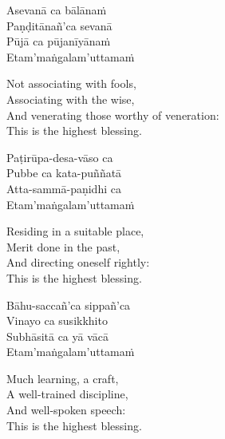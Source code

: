 \ifbfive\clearpage\fi

\begin{pali-hang-continued}
  Asevanā ca bālānaṁ\\
  Paṇḍitānañ'ca sevanā\\
  Pūjā ca pūjanīyānaṁ\\
  Etam'maṅgalam'uttamaṁ
\end{pali-hang-continued}

\ifafive\clearpage\fi

\begin{english-verses}
  Not associating with fools,\\
  Associating with the wise,\\
  And venerating those worthy of veneration:\\
  This is the highest blessing.
\end{english-verses}

\begin{pali-hang-continued}
  Paṭirūpa-desa-vāso ca\\
  Pubbe ca kata-puññatā\\
  Atta-sammā-paṇidhi ca\\
  Etam'maṅgalam'uttamaṁ
\end{pali-hang-continued}

\begin{english-verses}
  Residing in a suitable place,\\
  Merit done in the past,\\
  And directing oneself rightly:\\
  This is the highest blessing.
\end{english-verses}

\ifninebythirteen\clearpage\fi

\begin{pali-hang-continued}
  Bāhu-saccañ'ca sippañ'ca\\
  Vinayo ca susikkhito\\
  Subhāsitā ca yā vācā\\
  Etam'maṅgalam'uttamaṁ
\end{pali-hang-continued}

\begin{english-verses}
  Much learning, a craft,\\
  A well-trained discipline,\\
  And well-spoken speech:\\
  This is the highest blessing.
\end{english-verses}

